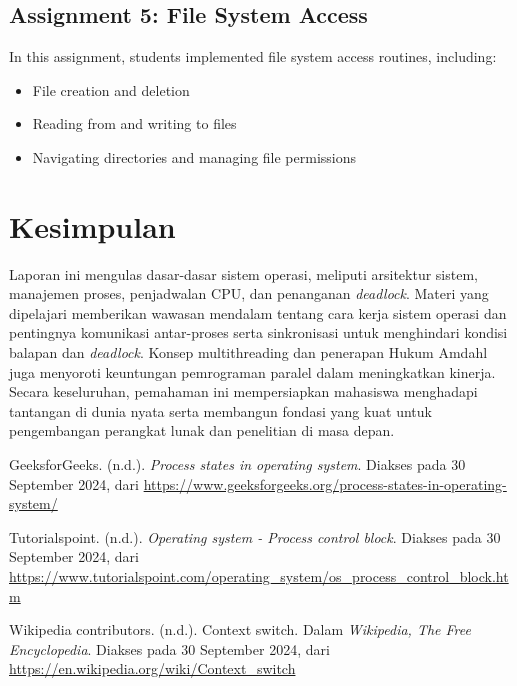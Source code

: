 \documentclass[12pt]{article}
\begin{document}
\subsection{Assignment 5: File System Access}
In this assignment, students implemented file system access routines, including:
\begin{itemize}
    \item File creation and deletion
    \item Reading from and writing to files
    \item Navigating directories and managing file permissions
\end{itemize}

\section{Kesimpulan}
Laporan ini mengulas dasar-dasar sistem operasi, meliputi arsitektur sistem, manajemen proses, penjadwalan CPU, dan penanganan \textit{deadlock}. Materi yang dipelajari memberikan wawasan mendalam tentang cara kerja sistem operasi dan pentingnya komunikasi antar-proses serta sinkronisasi untuk menghindari kondisi balapan dan \textit{deadlock}. Konsep multithreading dan penerapan Hukum Amdahl juga menyoroti keuntungan pemrograman paralel dalam meningkatkan kinerja. Secara keseluruhan, pemahaman ini mempersiapkan mahasiswa menghadapi tantangan di dunia nyata serta membangun fondasi yang kuat untuk pengembangan perangkat lunak dan penelitian di masa depan.



\begin{thebibliography}{}

\bibitem{}
GeeksforGeeks. (n.d.). \textit{Process states in operating system}. Diakses pada 30 September 2024, dari \url{https://www.geeksforgeeks.org/process-states-in-operating-system/}

\bibitem{}
Tutorialspoint. (n.d.). \textit{Operating system - Process control block}. Diakses pada 30 September 2024, dari \url{https://www.tutorialspoint.com/operating_system/os_process_control_block.htm}

\bibitem{}
Wikipedia contributors. (n.d.). Context switch. Dalam \textit{Wikipedia, The Free Encyclopedia}. Diakses pada 30 September 2024, dari \url{https://en.wikipedia.org/wiki/Context_switch}

\end{thebibliography}
\end{document}
